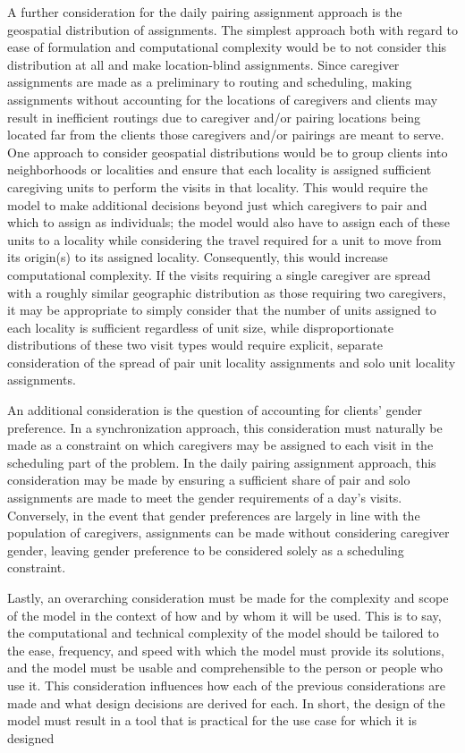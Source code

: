 \documentclass[11pt,twoside]{article}
\numberwithin{Theorem}{section}
\numberwithin{Definition}{section}
\numberwithin{Lemma}{section}
\numberwithin{Algorithm}{section}
\numberwithin{equation}{section}
\begin{document}
A further consideration for the daily pairing assignment approach is the geospatial distribution of assignments. The simplest approach both with regard to ease of formulation and computational complexity would be to not consider this distribution at all and make location-blind assignments. Since caregiver assignments are made as a preliminary to routing and scheduling, making assignments without accounting for the locations of caregivers and clients may result in inefficient routings due to caregiver and/or pairing locations being located far from the clients those caregivers and/or pairings are meant to serve. One approach to consider geospatial distributions would be to group clients into neighborhoods or localities and ensure that each locality is assigned sufficient caregiving units to perform the visits in that locality. This would require the model to make additional decisions beyond just which caregivers to pair and which to assign as individuals; the model would also have to assign each of these units to a locality while considering the travel required for a unit to move from its origin(s) to its assigned locality. Consequently, this would increase computational complexity. If the visits requiring a single caregiver are spread with a roughly similar geographic distribution as those requiring two caregivers, it may be appropriate to simply consider that the number of units assigned to each locality is sufficient regardless of unit size, while disproportionate distributions of these two visit types would require explicit, separate consideration of the spread of pair unit locality assignments and solo unit locality assignments. 

An additional consideration is the question of accounting for clients' gender preference. In a synchronization approach, this consideration must naturally be made as a constraint on which caregivers may be assigned to each visit in the scheduling part of the problem. In the daily pairing assignment approach, this consideration may be made by ensuring a sufficient share of pair and solo assignments are made to meet the gender requirements of a day's visits. Conversely, in the event that gender preferences are largely in line with the population of caregivers, assignments can be made without considering caregiver gender, leaving gender preference to be considered solely as a scheduling constraint.

Lastly, an overarching consideration must be made for the complexity and scope of the model in the context of how and by whom it will be used. This is to say, the computational and technical complexity of the model should be tailored to the ease, frequency, and speed with which the model must provide its solutions, and the model must be usable and comprehensible to the person or people who use it. This consideration influences how each of the previous considerations are made and what design decisions are derived for each. In short, the design of the model must result in a tool that is practical for the use case for which it is designed
\end{document}
